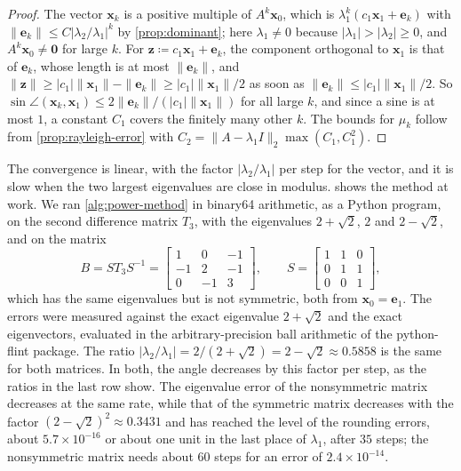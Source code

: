 \begin{proof}
The vector $\mathbf x_k$ is a positive multiple of $A^k\mathbf x_0$, which is $\lambda_1^k(c_1\mathbf x_1+\mathbf e_k)$ with $\|\mathbf e_k\|\le C|\lambda_2/\lambda_1|^k$ by \cref{prop:dominant}; here $\lambda_1\ne0$ because $|\lambda_1|>|\lambda_2|\ge0$, and $A^k\mathbf x_0\ne\mathbf 0$ for large $k$. For $\mathbf z\coloneqq c_1\mathbf x_1+\mathbf e_k$, the component orthogonal to $\mathbf x_1$ is that of $\mathbf e_k$, whose length is at most $\|\mathbf e_k\|$, and $\|\mathbf z\|\ge|c_1|\|\mathbf x_1\|-\|\mathbf e_k\|\ge|c_1|\|\mathbf x_1\|/2$ as soon as $\|\mathbf e_k\|\le|c_1|\|\mathbf x_1\|/2$. So $\sin\angle(\mathbf x_k,\mathbf x_1)\le2\|\mathbf e_k\|/(|c_1|\|\mathbf x_1\|)$ for all large $k$, and since a sine is at most $1$, a constant $C_1$ covers the finitely many other $k$. The bounds for $\mu_k$ follow from \cref{prop:rayleigh-error} with $C_2=\|A-\lambda_1I\|_2\max(C_1,C_1^2)$.
\end{proof}

The convergence is linear, with the factor $|\lambda_2/\lambda_1|$ per step for the vector, and it is slow when the two largest eigenvalues are close in modulus.  shows the method at work. We ran \cref{alg:power-method} in binary64 arithmetic, as a Python program, on the second difference matrix $T_3$, with the eigenvalues $2+\sqrt2$, $2$ and $2-\sqrt2$, and on the matrix
\[
B=ST_3S^{-1}=\begin{bmatrix}1&0&-1\\-1&2&-1\\0&-1&3\end{bmatrix},\qquad S=\begin{bmatrix}1&1&0\\0&1&1\\0&0&1\end{bmatrix},
\]
which has the same eigenvalues but is not symmetric, both from $\mathbf x_0=\mathbf e_1$. The errors were measured against the exact eigenvalue $2+\sqrt2$ and the exact eigenvectors, evaluated in the arbitrary-precision ball arithmetic of the python-flint package. The ratio $|\lambda_2/\lambda_1|=2/(2+\sqrt2)=2-\sqrt2\approx0.5858$ is the same for both matrices. In both, the angle decreases by this factor per step, as the ratios in the last row show. The eigenvalue error of the nonsymmetric matrix decreases at the same rate, while that of the symmetric matrix decreases with the factor $(2-\sqrt2)^2\approx0.3431$ and has reached the level of the rounding errors, about $5.7\times10^{-16}$ or about one unit in the last place of $\lambda_1$, after $35$ steps; the nonsymmetric matrix needs about $60$ steps for an error of $2.4\times10^{-14}$.

